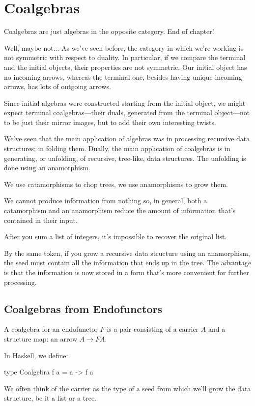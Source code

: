 \documentclass[DaoFP]{subfiles}
\begin{document}
\setcounter{chapter}{12}

\chapter{Coalgebras}

Coalgebras are just algebras in the opposite category. End of chapter!

Well, maybe not... As we've seen before, the category in which we're working is not symmetric with respect to duality. In particular, if we compare the terminal and the initial objects, their properties are not symmetric. Our initial object has no incoming arrows, whereas the terminal one, besides having unique incoming arrows, has lots of outgoing arrows. 

Since initial algebras were constructed starting from the initial object, we might expect terminal coalgebras---their duals, generated from the terminal object---not to be just their mirror images, but to add their own interesting twists.

We've seen that the main application of algebras was in processing recursive data structures: in folding them. Dually, the main application of coalgebras is in generating, or unfolding, of recursive, tree-like, data structures. The unfolding is done using an anamorphism.

We use catamorphisms to chop trees, we use anamorphisms to grow them. 

We cannot produce information from nothing so, in general, both a catamorphism and an anamorphism reduce the amount of information that's contained in their input. 

After you sum a list of integers, it's impossible to recover the original list. 

By the same token, if you grow a recursive data structure using an anamorphism, the seed must contain all the information that ends up in the tree. The advantage is that the information is now stored in a form that's more convenient for further processing.

\section{Coalgebras from Endofunctors}

A coalgebra for an endofunctor $F$ is a pair consisting of a carrier $A$ and a structure map: an arrow $A \to F A$. 

In Haskell, we define:
\begin{haskell}
 type Coalgebra f a = a -> f a
\end{haskell}
We often think of the carrier as the type of a seed from which we'll grow the data structure, be it a list or a tree. 
\end{document}
